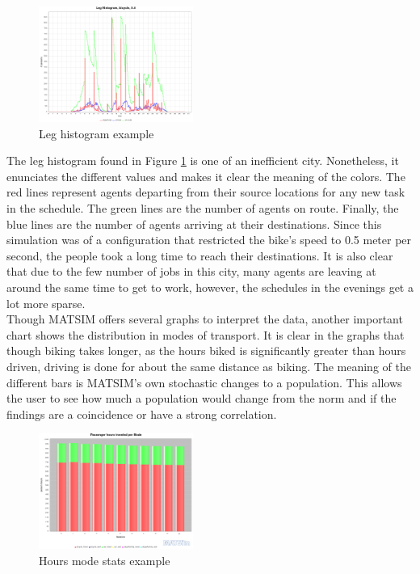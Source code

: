 \documentclass[11pt]{article}
\begin{document}
\begin{multicols}{2}
    \begin{figure}[H]
        \centering
        \includegraphics[width=0.45\textwidth]{images/legHistogram.png}
        \caption{Leg histogram example}
        \label{fig:leg-histogram}
    \end{figure}

    \quad The leg histogram found in Figure \ref{fig:leg-histogram} is one of an inefficient city. Nonetheless, it enunciates the different values and makes it clear the meaning of the colors. The red lines represent agents departing from their source locations for any new task in the schedule. The green lines are the number of agents on route. Finally, the blue lines are the number of agents arriving at their destinations. Since this simulation was of a configuration that restricted the bike's speed to 0.5 meter per second, the people took a long time to reach their destinations. It is also clear that due to the few number of jobs in this city, many agents are leaving at around the same time to get to work, however, the schedules in the evenings get a lot more sparse. \\

    \quad Though MATSIM offers several graphs to interpret the data, another important chart shows the distribution in modes of transport. It is clear in the graphs that though biking takes longer, as the hours biked is significantly greater than hours driven, driving is done for about the same distance as biking. The meaning of the different bars is MATSIM's own stochastic changes to a population. This allows the user to see how much a population would change from the norm and if the findings are a coincidence or have a strong correlation.

    \begin{figure}[H]
        \centering
        \includegraphics[width=0.45\textwidth]{images/phModestats.png}
        \caption{Hours mode stats example}
        \label{fig:ph-modestats}
    \end{figure}


\end{multicols}
\end{document}
